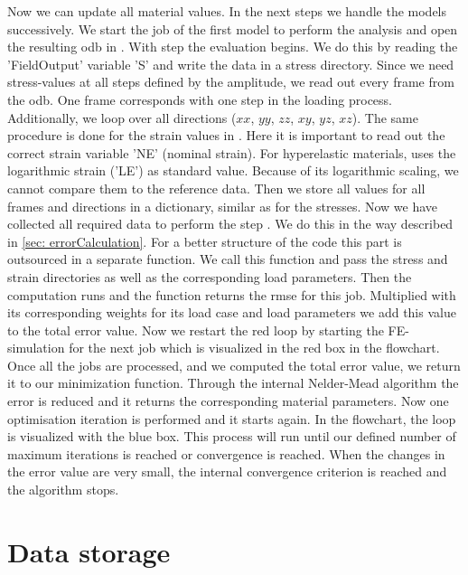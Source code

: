 Now we can update all material values. In the next steps we handle the models successively. We start the job of the first model to perform the  analysis and open the resulting \acrshort{odb} in . With step  the evaluation begins. We do this by reading the 'FieldOutput' variable 'S' and write the data in a stress directory. Since we need stress-values at all steps defined by the amplitude, we read out every frame from the \acrshort{odb}. One frame corresponds with one step in the loading process. Additionally, we loop over all directions ($xx$, $yy$, $zz$, $xy$, $yz$, $xz$). The same procedure is done for the strain values in . Here it is important to read out the correct strain variable 'NE' (nominal strain). For hyperelastic materials,  uses the logarithmic strain ('LE') as standard value. Because of its logarithmic scaling, we cannot compare them to the reference data. Then we store all values for all frames and directions in a dictionary, similar as for the stresses. Now we have collected all required data to perform the step . We do this in the way described in \autoref{sec: errorCalculation}. For a better structure of the code this part is outsourced in a separate function. We call this function and pass the stress and strain directories as well as the corresponding load parameters. Then the computation runs and the function returns the \acrshort{rmse} for this job. Multiplied with its corresponding weights for its load case and load parameters we add this value to the total error value. Now we restart the red loop by starting the FE-simulation for the next job which is visualized in the red box in the flowchart. Once all the jobs are processed, and we computed the total error value, we return it to our minimization function. Through the internal Nelder-Mead algorithm the error is reduced and it returns the corresponding material parameters. Now one optimisation iteration is performed and it starts again. In the flowchart, the loop is visualized with the blue box. This process will run until our defined number of maximum iterations is reached or convergence is reached. When the changes in the error value are very small, the internal convergence criterion is reached and the algorithm stops.


\section{Data storage} \label{sec: dataStorage}

